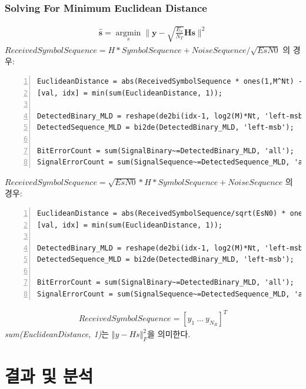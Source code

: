 \documentclass{article}
\begin{document}
\subsubsection{Solving For Minimum Euclidean Distance}
\begin{gather}
\boldsymbol{\hat{s}}=\operatorname*{argmin}_s \lVert\boldsymbol{y}-\sqrt{\frac{E_s}{N_T}}\boldsymbol{Hs}\rVert^2
\end{gather}
$ReceivedSymbolSequence = H * SymbolSequence + NoiseSequence / \sqrt{EsN0}$ 의 경우:
\begin{lstlisting}[style=Matlab-editor, frame=single, numbers=left,]
% 'EuclideanDistance' results in Nt x M^Nt, each column representing each candidate symbol combination
EuclideanDistance = abs(ReceivedSymbolSequence * ones(1,M^Nt) - H*Candidates).^2;
[val, idx] = min(sum(EuclideanDistance, 1));

DetectedBinary_MLD = reshape(de2bi(idx-1, log2(M)*Nt, 'left-msb'),log2(M),[])';
DetectedSequence_MLD = bi2de(DetectedBinary_MLD, 'left-msb');

BitErrorCount = sum(SignalBinary~=DetectedBinary_MLD, 'all');
SignalErrorCount = sum(SignalSequence~=DetectedSequence_MLD, 'all');
\end{lstlisting}
$ReceivedSymbolSequence = \sqrt{EsN0} * H * SymbolSequence + NoiseSequence$ 의 경우:
\begin{lstlisting}[style=Matlab-editor, frame=single, numbers=left,]
% 'EuclideanDistance' results in Nt x M^Nt, each column representing each candidate symbol combination
EuclideanDistance = abs(ReceivedSymbolSequence/sqrt(EsN0) * ones(1,M^Nt) - H*Candidates).^2;
[val, idx] = min(sum(EuclideanDistance, 1));

DetectedBinary_MLD = reshape(de2bi(idx-1, log2(M)*Nt, 'left-msb'),log2(M),[])';
DetectedSequence_MLD = bi2de(DetectedBinary_MLD, 'left-msb');

BitErrorCount = sum(SignalBinary~=DetectedBinary_MLD, 'all');
SignalErrorCount = sum(SignalSequence~=DetectedSequence_MLD, 'all');
\end{lstlisting}
\begin{gather}
ReceivedSymbolSequence=[y_1\ \hdots\ y_{N_R}]^T
\end{gather}
\textsl{sum(EuclideanDistance, 1)}는 $\Vert y-Hs\Vert_F^2$을 의미한다.
\section{결과 및 분석}
\end{document}
